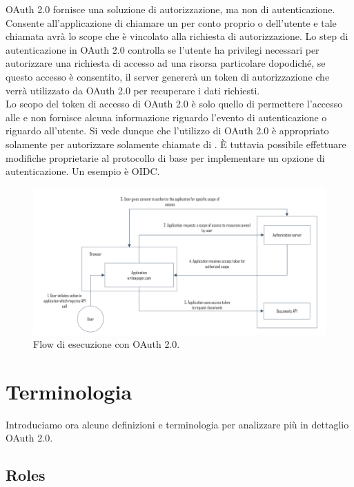 OAuth 2.0 fornisce una soluzione di autorizzazione, ma non di autenticazione. Consente
all'applicazione di chiamare un \api{} per conto proprio o dell'utente e tale chiamata
avrà lo scope che è vincolato alla richiesta di autorizzazione. Lo step di
autenticazione in OAuth 2.0 controlla se l'utente ha privilegi necessari per
autorizzare una richiesta di accesso ad una risorsa particolare dopodiché, se
questo accesso è consentito, il server genererà un token di autorizzazione che
verrà utilizzato da OAuth 2.0 per recuperare i dati richiesti.\\
Lo scopo del token di accesso di OAuth 2.0 è solo quello di permettere l'accesso alle
\api{} e non fornisce alcuna informazione riguardo l'evento di autenticazione o riguardo
all'utente.
Si vede dunque che l'utilizzo di OAuth 2.0 è appropriato solamente per autorizzare
solamente chiamate di \api{}. È tuttavia possibile effettuare modifiche proprietarie al
protocollo di base per implementare un opzione di autenticazione. Un esempio è
OIDC.

\begin{figure}[H]
      \centering
      \includegraphics[width=\textwidth, keepaspectratio]{capitoli/id_managing/imgs/api2.png}
      \caption{Flow di esecuzione con OAuth 2.0.}
\end{figure}

\section{Terminologia}

Introduciamo ora alcune definizioni e terminologia per analizzare più in dettaglio
OAuth 2.0.

\subsection{Roles}

